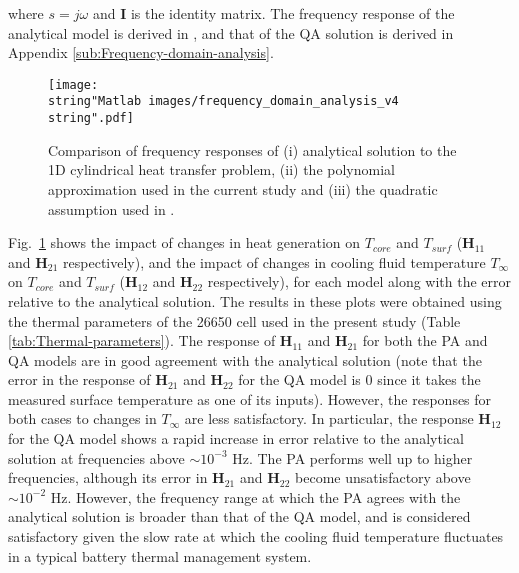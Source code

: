 \documentclass[journal, english]{IEEEtran}
\begin{document}
where $s=j\omega$ and $\mathbf{I}$ is the identity matrix. The frequency
response of the analytical model is derived in \cite{Muratori2010a}, and that of the QA solution is derived in Appendix \ref{sub:Frequency-domain-analysis}.

\begin{figure}[h]
\begin{centering}
\texttt{[image: \\string"Matlab images/frequency\_domain\_analysis\_v4\\string".pdf]}
\par\end{centering}
\caption{Comparison of frequency responses of (i) analytical solution to the
1D cylindrical heat transfer problem, (ii) the polynomial approximation
used in the current study and (iii) the quadratic assumption
used in \cite{Richardson2014}.\label{fig:Frequency-response}}
\end{figure}

Fig.\ \ref{fig:Frequency-response} shows  the impact of changes in heat generation on 
 $T_{core}$ and $T_{surf}$ ($\mathbf{H}_{11}$ and $\mathbf{H}_{21}$
respectively), and the impact of changes in cooling fluid temperature $T_{\infty}$ on $T_{core}$
and $T_{surf}$ ($\mathbf{H}_{12}$ and \textbf{$\mathbf{H}_{22}$}
respectively), for each model along with the error relative to the
analytical solution.
The results in these plots were obtained using the thermal parameters of the 26650 cell used  in the present study (Table \ref{tab:Thermal-parameters}).
The response of $\mathbf{H}_{11}$ and $\mathbf{H}_{21}$
for both the PA and QA models are in good agreement with the analytical
solution (note that the error in the response of $\mathbf{H}_{21}$
and $\mathbf{H}_{22}$ for the QA model is $0$ since it takes the
measured surface temperature as one of its inputs). However, the responses
for both cases to changes in $T_{\infty}$ are less satisfactory.
In particular, the response $\mathbf{H}_{12}$ for the QA model shows
a rapid increase in error relative to the analytical solution at frequencies
above $\sim10^{-3}$ Hz. The PA performs well up to higher frequencies,
although its error in $\mathbf{H}_{21}$ and $\mathbf{H}_{22}$ become
unsatisfactory above $\sim10^{-2}$ Hz. However, the frequency range
at which the PA agrees with the analytical solution is broader than
that of the QA model, and is considered satisfactory given the slow
rate at which the cooling fluid temperature fluctuates in a typical battery thermal
management system.
\end{document}
